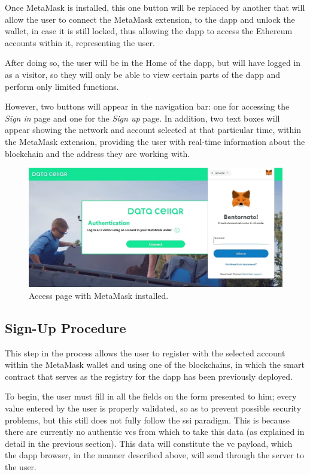 Once MetaMask is installed, this one button will be replaced by another that will allow the user to connect the MetaMask extension, to the \gls{dapp} and unlock the wallet,
in case it is still locked, thus allowing the \gls{dapp} to access the Ethereum accounts within it, representing the user.

After doing so, the user will be in the Home of the \gls{dapp}, but will have logged in as a visitor, so they will only be able to view certain parts of the \gls{dapp} 
and perform only limited functions.

However, two buttons will appear in the navigation bar: one for accessing the \textit{Sign in} page and one for the \textit{Sign up} page. In addition, two text boxes will appear showing the 
network and account selected at that particular time, within the MetaMask extension, providing the user with real-time information about the blockchain and the address they 
are working with.

\begin{figure}[h]  
  \centering
  \includegraphics[width=1\textwidth]{Images/c6_1.jpg} 
  \caption{Access page with MetaMask installed.}
\end{figure}

\subsection{Sign-Up Procedure}

This step in the process allows the user to register with the selected account within the MetaMask wallet and using one of the blockchains, in which the smart contract that 
serves as the registry for the \gls{dapp} has been previously deployed.

To begin, the user must fill in all the fields on the form presented to him; every value entered by the user is properly validated, so as to prevent possible security 
problems, but this still does not fully follow the \gls{ssi} paradigm. This is because there are currently no authentic \gls{vc}s from which to take this data (as 
explained in detail in the previous section). This data will constitute the \gls{vc} payload, which the \gls{dapp} browser, in the manner described above, will send through the 
server to the user.

